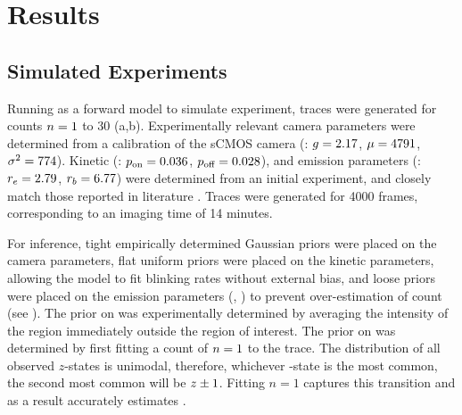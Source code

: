 \section{Results}






\subsection{Simulated Experiments}
Running \ours as a forward model to simulate experiment, 
traces were generated for counts $n=1$ to 30 (a,b).
	Experimentally relevant camera parameters were determined from a calibration of the
	sCMOS camera (\parametersc: $g=2.17$, $\mu=4791$, $\sigma^2=774$). 
	Kinetic (\parameterst: $p_\text{on}=0.036$, $p_\text{off}=0.028$), and emission parameters 
	(\parameterse: $r_e=2.79$, $r_b=6.77$) were determined from an
	initial experiment, and closely match those reported in literature \cite{stein_2021}.
	Traces were generated for 4000 frames, corresponding to an imaging time of 14 minutes.

For inference, tight empirically determined Gaussian priors were placed on 
the camera parameters,
	flat uniform priors were placed on the kinetic parameters, allowing the model 
	to fit blinking rates without external bias,
	and loose priors were placed on the emission parameters (\rb, \re) to prevent 
	over-estimation of count (see ). 
	The prior on \rb was experimentally determined by averaging the 
	intensity of the region immediately outside the region of interest.
	The prior on \re was determined by first fitting a count of $n=1$ to the trace.
	The distribution of all observed $z$-states is unimodal, 
	therefore, whichever \z{}-state is the most common, the second most common 
	will be $z_{} \pm 1$. 
	Fitting $n=1$ captures this transition and as a result 
	accurately estimates \re.
	
